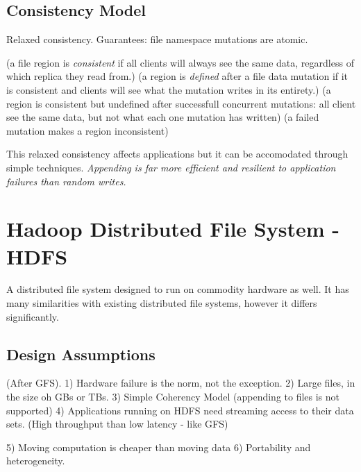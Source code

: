 \documentclass[letterpaper,twocolumn,10pt]{article}
\begin{document}
\subsection{Consistency Model}
Relaxed consistency. Guarantees: 
	file namespace mutations are atomic.

(a file region is \textit{consistent} if all clients will always see the same data, regardless of which replica they read from.)
(a region is \textit{defined} after a file data mutation if it is consistent and clients will see what the mutation writes in its entirety.)
(a region is consistent but undefined after successfull concurrent mutations: all client see the same data, but not what each one mutation has written)
(a failed mutation makes a region inconsistent)

This relaxed consistency affects applications but it can be accomodated through simple techniques. \textit{Appending is far more efficient and resilient to application failures than random writes.}


\section{Hadoop Distributed File System - HDFS}
A distributed file system designed to run on commodity hardware as well. It has many similarities with existing distributed file systems, however it differs significantly.
\subsection{Design Assumptions}
(After GFS).
1) Hardware failure is the norm, not the exception.
2) Large files, in the size oh GBs or TBs.
3) Simple Coherency Model (appending to files is not supported)
4) Applications running on HDFS need streaming access to their data sets. (High throughput than low latency - like GFS)

5) Moving computation is cheaper than moving data
6) Portability and heterogeneity.



{\footnotesize 
}


\theendnotes
\end{document}
